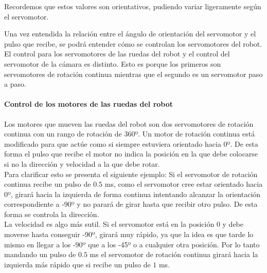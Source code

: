 \documentclass[twoside, 11pt]{epstfg}
\begin{document}
Recordemos que estos valores son orientativos, pudiendo variar ligeramente según el servomotor.

%
%
%
%
%
%
%
%

Una vez entendida la relación entre el ángulo de orientación del servomotor y el pulso que recibe, se podrá entender cómo se controlan los servomotores del robot.\\ El control para los servomotores de las ruedas del robot y el control del servomotor de la cámara es distinto. Esto es porque los primeros son servomotores de rotación continua mientras que el segundo es un servomotor paso a paso.



\paragraph{Control de los motores de las ruedas del robot}

Los motores que mueven las ruedas del robot son dos servomotores de rotación continua con un rango de rotación de 360º. Un motor de rotación continua está modificado para que actúe como si siempre estuviera orientado hacia 0º. De esta forma el pulso que recibe el motor no indica la posición en la que debe colocarse si no la dirección y velocidad a la que debe rotar.\\ Para clarificar esto se presenta el siguiente ejemplo: Si el servomotor de rotación continua recibe un pulso de $0.5$ ms, como el servomotor cree estar orientado hacia 0º, girará hacia la izquierda de forma continua intentando alcanzar la orientación correspondiente a -90º y no parará de girar hasta que recibir otro pulso. De esta forma se controla la dirección.\\
La velocidad es algo más sutil. Si el servomotor está en la posición 0 y debe moverse hasta conseguir -90º, girará muy rápido, ya que la idea es que tarde lo mismo en llegar a los -90º que a los -45º o a cualquier otra posición. Por lo tanto mandando un pulso de $0.5$ ms el servomotor de rotación continua girará hacia la izquierda más rápido que si recibe un pulso de $1$ ms.
\end{document}
